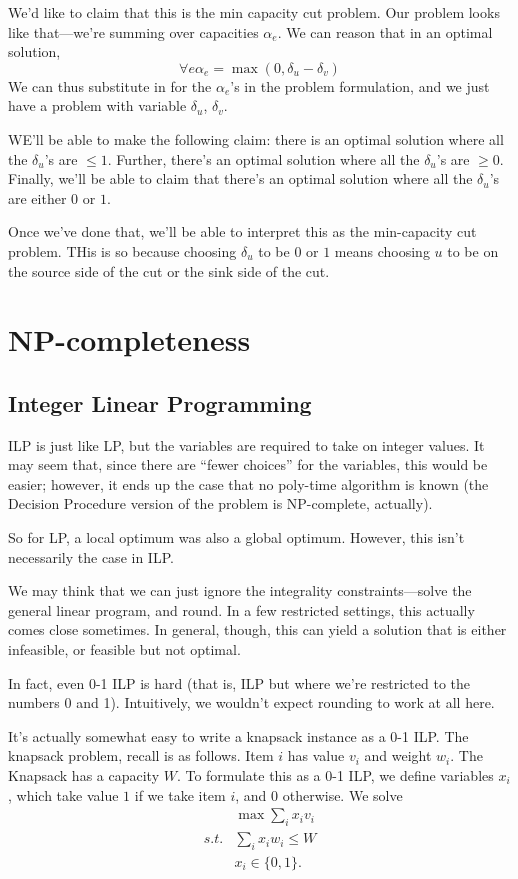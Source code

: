 \documentclass{article}
\begin{document}
We'd like to claim that this is the min capacity cut problem. Our problem
looks like that---we're summing over capacities $\alpha_e$.
We can reason that in an optimal solution,
$$
\forall e \alpha_e = \max(0, \delta_u - \delta_v)
$$
We can thus substitute in for the $\alpha_e$'s in the problem formulation,
and we just have a problem with variable $\delta_u$, $\delta_v$.

WE'll be able to make the following claim: there is an optimal solution
where all the $\delta_u$'s are $\leq 1$.
Further, there's an optimal solution where all the $\delta_u$'s are $\geq 0$.
Finally, we'll be able to claim that there's an optimal solution where
all the $\delta_u$'s are either $0$ or $1$.

Once we've done that, we'll be able to interpret this as the min-capacity
cut problem. THis is so because choosing $\delta_u$ to be $0$
or $1$ means choosing $u$ to be on the source side of the cut or the sink
side of the cut.


\section{NP-completeness}

\subsection{Integer Linear Programming}

ILP is just like LP, but the variables are required to take on integer values.
It may seem that, since there are ``fewer choices'' for the variables,
this would be easier; however, it ends up the case that no poly-time
algorithm is known (the Decision Procedure version of the problem is 
NP-complete, actually).

So for LP, a local optimum was also a global optimum. However, this isn't
necessarily the case in ILP.

We may think that we can just ignore the integrality constraints---solve the
general linear program, and round. In a few restricted settings, this actually
comes close sometimes. In general, though, this can yield a solution
that is either infeasible, or feasible but not optimal.

In fact, even 0-1 ILP is hard (that is, ILP but where we're restricted to
the numbers 0 and 1). Intuitively, we wouldn't expect rounding to work at
all here. 

It's actually somewhat easy to write a knapsack instance
as a 0-1 ILP.
The knapsack problem, recall is as follows. Item $i$ has value $v_i$ and
weight $w_i$. The Knapsack has a capacity $W$.
To formulate this as a 0-1 ILP, we define variables $x_i$, which take
value $1$ if we take item $i$, and $0$ otherwise.
We solve
\begin{align}
& \max \sum_i x_i v_i \\
s.t. & \sum_i x_i w_i \leq W \\
& x_i \in \{0,1\}.
\end{align}
\end{document}
